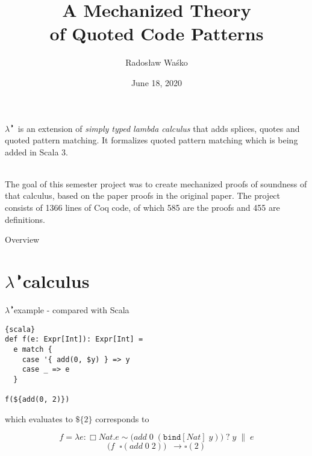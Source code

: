 \documentclass{beamer}
\title{A Mechanized Theory \\ of Quoted Code Patterns}
\author{Radosław Waśko}
\date{June 18, 2020}
\newcommand{\calculus}{$\lambda^{\RIGHTcircle}$}
\newcommand{\qtype}[1]{\Box#1}
\newcommand{\app}[2]{#1\;#2}
\newcommand{\patnat}[1]{#1}
\newcommand{\patapp}[2]{#1\;#2}
\newcommand{\patbind}[2]{\texttt{bind}[#2]\;#1}
\newcommand{\patmat}[4]{\patmatSP{#1}{#2}\patmatThen{#3}#4}
\newcommand{\patmatSP}[2]{#1 \sim #2\;?}
\newcommand{\patmatThen}[1]{\;#1\; \| \;}
\newcommand{\lam}[3]{\lambda#1{:}#2.#3}
\begin{document}
  \begin{frame}
  \titlepage
\end{frame}
\begin{frame}
  \calculus \, is an extension of \textit{simply typed lambda calculus} that adds splices, quotes and quoted pattern matching. It formalizes quoted pattern matching which is being added in Scala 3. \\~\
  
  The goal of this semester project was to create mechanized proofs of soundness of that calculus, based on the paper proofs in the original paper. The project consists of 1366 lines of Coq code, of which 585 are the proofs and 455 are definitions.
\end{frame}
\begin{frame}{Overview}
  \tableofcontents
\end{frame}

\section{\calculus calculus}
\begin{frame}[fragile]{\calculus example - compared with Scala}

\begin{lstlisting}{scala}
def f(e: Expr[Int]): Expr[Int] =
  e match {
    case '{ add(0, $y) } => y
    case _ => e
  }

f(${add(0, 2)})
\end{lstlisting}

which evaluates to $\$\{2\}$ corresponds to

\begin{equation*}
f = \lam{e}{\qtype{Nat}}{\patmat{e}{\big( \patapp{\patapp{add}{\patnat{0}}}{(\patbind{y}{Nat})} \big)}{y}{e}}
\end{equation*}
\begin{equation*}
\big(\app{f \;}{\square(\app{\app{add}{0}}{2})} \big) \;\; \longrightarrow \square(2)
\end{equation*}
\end{frame}
\end{document}
